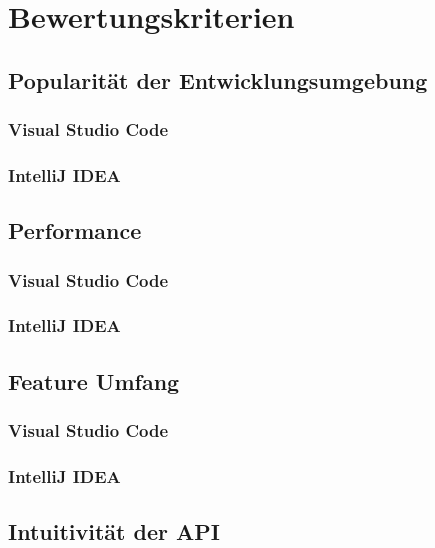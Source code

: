 \chapter{Bewertungskriterien}
\label{cha:Kriterien}

\section{Popularität der Entwicklungsumgebung}
\label{sec:Kriterien_Popularität}

\subsection{Visual Studio Code}

\subsection{IntelliJ IDEA}


\section{Performance}
\label{sec:Kriterien_Performance}

\subsection{Visual Studio Code}

\subsection{IntelliJ IDEA}


\section{Feature Umfang}
\label{sec:Kriterien_FeatureUmfang}

\subsection{Visual Studio Code}

\subsection{IntelliJ IDEA}


\section{Intuitivität der API}
\label{sec:Kriterien_Intuitivität}


